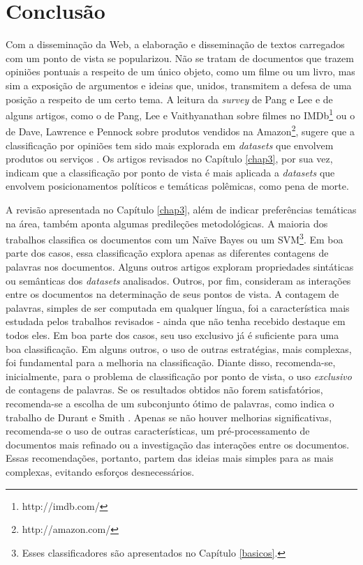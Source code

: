 \chapter{Conclusão}
\label{conclusoes}

Com a disseminação da Web, a elaboração e disseminação de textos carregados com um ponto de vista se popularizou. Não se tratam de documentos que trazem opiniões pontuais a respeito de um único objeto, como um filme ou um livro, mas sim a exposição de argumentos e ideias que, unidos, transmitem a defesa de uma posição a respeito de um certo tema. A leitura da \emph{survey} de Pang e Lee e de alguns artigos, como o de Pang, Lee e Vaithyanathan sobre filmes no IMDb\footnote{http://imdb.com/} ou o de Dave, Lawrence e Pennock sobre produtos vendidos na Amazon\footnote{http://amazon.com/}, sugere que a classificação por opiniões tem sido mais explorada em \emph{datasets} que envolvem produtos ou serviços \cite{omsa} \cite{thumbs-up} \cite{peanut-gallery}. Os artigos revisados no Capítulo \ref{chap3}, por sua vez, indicam que a classificação por ponto de vista é mais aplicada a \emph{datasets} que envolvem posicionamentos políticos e temáticas polêmicas, como pena de morte.

A revisão apresentada no Capítulo \ref{chap3}, além de indicar preferências temáticas na área, também aponta algumas predileções metodológicas. A maioria dos trabalhos classifica os documentos com um Naïve Bayes ou um SVM\footnote{Esses classificadores são apresentados no Capítulo \ref{basicos}.}. Em boa parte dos casos, essa classificação explora apenas as diferentes contagens de palavras nos documentos. Alguns outros artigos exploram propriedades sintáticas ou semânticas dos \emph{datasets} analisados. Outros, por fim, consideram as interações entre os documentos na determinação de seus pontos de vista. A contagem de palavras, simples de ser computada em qualquer língua, foi a característica mais estudada pelos trabalhos revisados - ainda que não tenha recebido destaque em todos eles. Em boa parte dos casos, seu uso exclusivo já é suficiente para uma boa classificação. Em alguns outros, o uso de outras estratégias, mais complexas, foi fundamental para a melhoria na classificação. Diante disso, recomenda-se, inicialmente, para o problema de classificação por ponto de vista, o uso \emph{exclusivo} de contagens de palavras. Se os resultados obtidos não forem satisfatórios, recomenda-se a escolha de um subconjunto ótimo de palavras, como indica o trabalho de Durant e Smith \cite{durant-smith}. Apenas se não houver melhorias significativas, recomenda-se o uso de outras características, um pré-processamento de documentos mais refinado ou a investigação das interações entre os documentos. Essas recomendações, portanto, partem das ideias mais simples para as mais complexas, evitando esforços desnecessários. 

